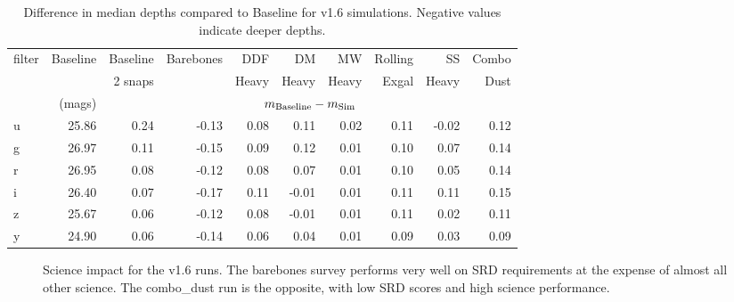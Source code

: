 \begin{table}
\begin{centering}
\begin{tabular}{lrrrrrrrrr}
\toprule
filter &  Baseline &  Baseline &  Barebones &  DDF  &  DM  &  MW  &  Rolling  &  SS  &  Combo  \\
 & & 2 snaps & & Heavy & Heavy & Heavy & Exgal & Heavy & Dust \\
 & (mags) &  \multicolumn{8}{c}{$m_{\rm{Baseline}} - m_{\rm{Sim}}$} \\ 
\hline
     u &     25.86 &              0.24 &      -0.13 &       0.08 &      0.11 &      0.02 &           0.11 &     -0.02 &        0.12 \\
     g &     26.97 &              0.11 &      -0.15 &       0.09 &      0.12 &      0.01 &           0.10 &      0.07 &        0.14 \\
     r &     26.95 &              0.08 &      -0.12 &       0.08 &      0.07 &      0.01 &           0.10 &      0.05 &        0.14 \\
     i &     26.40 &              0.07 &      -0.17 &       0.11 &     -0.01 &      0.01 &           0.11 &      0.11 &        0.15 \\
     z &     25.67 &              0.06 &      -0.12 &       0.08 &     -0.01 &      0.01 &           0.11 &      0.02 &        0.11 \\
     y &     24.90 &              0.06 &      -0.14 &       0.06 &      0.04 &      0.01 &           0.09 &      0.03 &        0.09 \\
\end{tabular}
\caption{Difference in median depths compared to Baseline for v1.6 simulations. Negative values indicate deeper depths.}\label{table:depths}
\end{centering}
\end{table}

\begin{figure}
\caption{Science impact for the v1.6 runs. The barebones survey performs very well on SRD requirements at the expense of almost all other science. The combo\_dust run is the opposite, with low SRD scores and high science performance.}\label{fig:v16radar}
\end{figure}